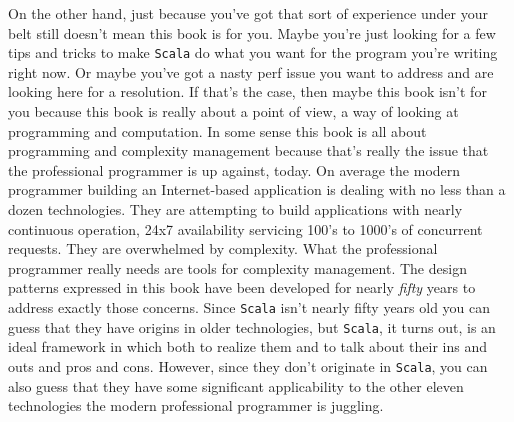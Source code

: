 On the other hand, just because you've got that sort of experience
under your belt still doesn't mean this book is for you. Maybe you're
just looking for a few tips and tricks to make \texttt{Scala} do what
you want for the program you're writing right now. Or maybe you've got
a nasty perf issue you want to address and are looking here for a
resolution. If that's the case, then maybe this book isn't for you
because this book is really about a point of view, a way of looking at
programming and computation. In some sense this book is all about
programming and complexity management because that's really the issue
that the professional programmer is up against, today. On average the
modern programmer building an Internet-based application is dealing
with no less than a dozen technologies. They are attempting to build
applications with nearly continuous operation, 24x7 availability
servicing 100's to 1000's of concurrent requests. They are overwhelmed
by complexity. What the professional programmer really needs are tools
for complexity management. The design patterns expressed in this book
have been developed for nearly \emph{fifty} years to address exactly
those concerns. Since \texttt{Scala} isn't nearly fifty years old you
can guess that they have origins in older technologies, but
\texttt{Scala}, it turns out, is an ideal framework in which both to
realize them and to talk about their ins and outs and pros and
cons. However, since they don't originate in \texttt{Scala}, you can
also guess that they have some significant applicability to the other
eleven technologies the modern professional programmer is juggling.